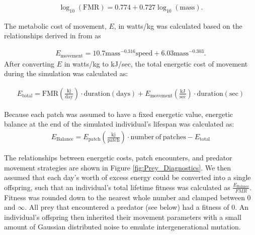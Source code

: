 \documentclass[12pt]{article}
\begin{document}
\begin{gather}
\log_{10}(\mathrm{FMR}) = 0.774 + 0.727 \log_{10}(\mathrm{mass}).
\end{gather}

The metabolic cost of movement, $E$, in watts/kg was calculated based on the relationships derived in from \cite{Taylor:1982} as

\begin{gather}
E_{\mathrm{movement}} = 10.7 \mathrm{mass}^{-0.316} \mathrm{speed} + 6.03 \mathrm{mass}^{-0.303}.
\end{gather}
After converting $E$ in watts/kg to kJ/sec, the total energetic cost of movement during the simulation was calculated as:

\begin{gather}
E_{\mathrm{total}} = \mathrm{FMR (\frac{kj}{day}) \cdot duration (days)} + E_{\mathrm{movement}} \mathrm{(\frac{kJ}{sec}) \cdot duration (sec)}
\end{gather}

Because each patch was assumed to have a fixed energetic value, energetic balance at the end of the simulated individual's lifespan was calculated as:
\begin{gather}
E_{\mathrm{Balance}} = E_{\mathrm{patch}} \mathrm{(\frac{kj}{patch})} \cdot \mathrm{number~of~patches} - E_{\mathrm{total}}
\end{gather}

The relationships between energetic costs, patch encounters, and predator movement strategies are shown in Figure \ref{fig:Prey_Diagnostics}.  We then assumed that each day’s worth of excess energy could be converted into a single offspring, such that an individual's total lifetime fitness was calculated as $\frac{E_{\mathrm{Balance}}}{FMR}$. Fitness was rounded down to the nearest whole number and clamped between 0 and $\infty$. All prey that encountered a predator (see below) had a fitness of 0. An individual's offspring then inherited their movement parameters with a small amount of Gaussian distributed noise to emulate intergenerational mutation.
\end{document}
